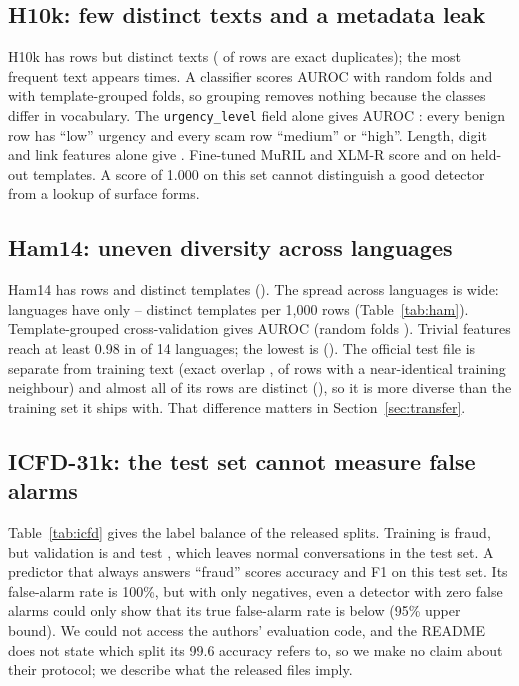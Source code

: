 \documentclass[conference]{IEEEtran}
\begin{document}
\subsection{H10k: few distinct texts and a metadata leak}
H10k has \HkN{} rows but \HkUnique{} distinct texts (\HkDupPct{} of rows are exact duplicates); the most frequent text appears \HkTopCount{} times. A classifier scores AUROC \HkRandAuc{} with random folds and \HkGroupAuc{} with template-grouped folds, so grouping removes nothing because the classes differ in vocabulary. The \texttt{urgency\_level} field alone gives AUROC \HkUrgAuc{}: every benign row has ``low'' urgency and every scam row ``medium'' or ``high''. Length, digit and link features alone give \HkTrivAuc{}. Fine-tuned MuRIL and XLM-R score \MuHkIid{} and \XlHkIid{} on held-out templates. A score of 1.000 on this set cannot distinguish a good detector from a lookup of surface forms.

\subsection{Ham14: uneven diversity across languages}
Ham14 has \HamN{} rows and \HamMasked{} distinct templates (\HamMaskedPct{}). The spread across languages is wide: \HamLowN{} languages have only \HamLowMin{}--\HamLowMax{} distinct templates per 1{,}000 rows (Table~\ref{tab:ham}). Template-grouped cross-validation gives AUROC \HamGroupAuc{} (random folds \HamRandAuc{}). Trivial features reach at least 0.98 in \HamTrivHigh{} of 14 languages; the lowest is \HamTrivMin{} (\HamTrivMinLang{}). The official test file is separate from training text (exact overlap \HamTestExact{}, \HamTestNN{} of rows with a near-identical training neighbour) and almost all of its \HamTestN{} rows are distinct (\HamTestUnique{}), so it is more diverse than the training set it ships with. That difference matters in Section~\ref{sec:transfer}.

\begin{table}[t]
\centering
\caption{Ham14: distinct templates per 1{,}000 rows, and AUROC of a classifier that sees only length, digit and link features (five-fold CV).}
\label{tab:ham}
\small

\end{table}

\subsection{ICFD-31k: the test set cannot measure false alarms}
Table~\ref{tab:icfd} gives the label balance of the released splits. Training is \IcfdTrFraud{} fraud, but validation is \IcfdVaFraud{} and test \IcfdTeFraud{}, which leaves \IcfdTeNormal{} normal conversations in the test set. A predictor that always answers ``fraud'' scores \IcfdAllFraudAcc{} accuracy and \IcfdAllFraudF{} F1 on this test set. Its false-alarm rate is 100\%, but with only \IcfdTeNormal{} negatives, even a detector with zero false alarms could only show that its true false-alarm rate is below \IcfdAllFraudCi{} (95\% upper bound). We could not access the authors' evaluation code, and the README does not state which split its 99.6 accuracy refers to, so we make no claim about their protocol; we describe what the released files imply.
\end{document}
